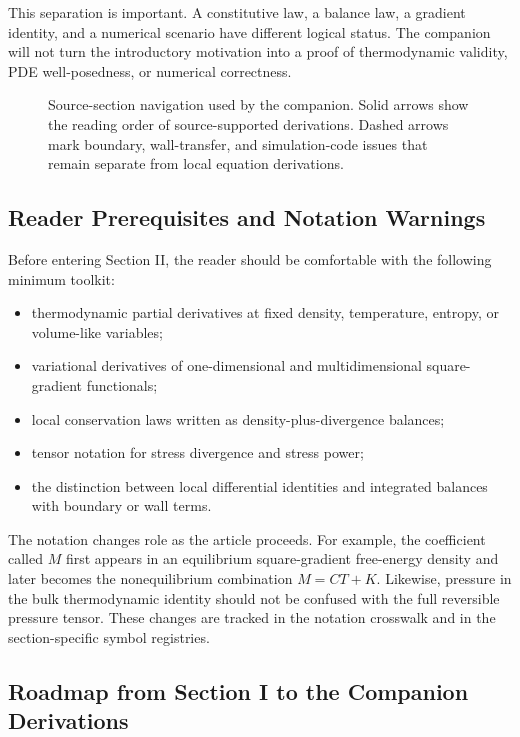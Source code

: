 This separation is important.  A constitutive law, a balance law, a gradient
identity, and a numerical scenario have different logical status.  The companion
will not turn the introductory motivation into a proof of thermodynamic
validity, PDE well-posedness, or numerical correctness.

\begin{figure}[htbp]
\centering
\resizebox{\linewidth}{!}{}
\caption{Source-section navigation used by the companion.  Solid arrows show
the reading order of source-supported derivations.  Dashed arrows mark
boundary, wall-transfer, and simulation-code issues that remain separate from
local equation derivations.}
\label{fig:source-section-navigation}
\end{figure}

\subsection{Reader Prerequisites and Notation Warnings}

Before entering Section II, the reader should be comfortable with the following
minimum toolkit:

\begin{itemize}
\item thermodynamic partial derivatives at fixed density, temperature, entropy,
  or volume-like variables;
\item variational derivatives of one-dimensional and multidimensional
  square-gradient functionals;
\item local conservation laws written as density-plus-divergence balances;
\item tensor notation for stress divergence and stress power;
\item the distinction between local differential identities and integrated
  balances with boundary or wall terms.
\end{itemize}

The notation changes role as the article proceeds.  For example, the coefficient
called \(M\) first appears in an equilibrium square-gradient free-energy density
and later becomes the nonequilibrium combination \(M=CT+K\).  Likewise,
pressure in the bulk thermodynamic identity should not be confused with the full
reversible pressure tensor.  These changes are tracked in the notation
crosswalk and in the section-specific symbol registries.

\subsection{Roadmap from Section I to the Companion Derivations}

